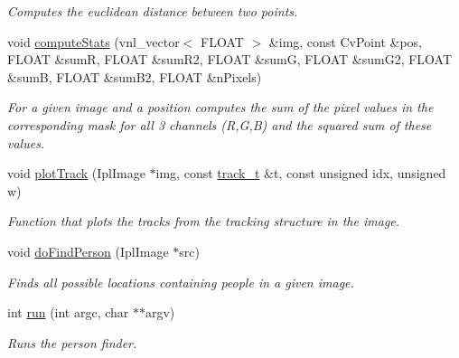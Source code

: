 \begin{DoxyCompactItemize}
\begin{DoxyCompactList}\small\item\em Computes the euclidean distance between two points. \item\end{DoxyCompactList}\item 
\hypertarget{classfindPersonImage_a2de4b333ccb9d7ef8251bb9e37cc1b67}{
void \hyperlink{classfindPersonImage_a2de4b333ccb9d7ef8251bb9e37cc1b67}{computeStats} (vnl\_\-vector$<$ FLOAT $>$ \&img, const CvPoint \&pos, FLOAT \&sumR, FLOAT \&sumR2, FLOAT \&sumG, FLOAT \&sumG2, FLOAT \&sumB, FLOAT \&sumB2, FLOAT \&nPixels)}
\label{classfindPersonImage_a2de4b333ccb9d7ef8251bb9e37cc1b67}

\begin{DoxyCompactList}\small\item\em For a given image and a position computes the sum of the pixel values in the corresponding mask for all 3 channels (R,G,B) and the squared sum of these values. \item\end{DoxyCompactList}\item 
\hypertarget{classfindPersonImage_abbe593e6141fbed267f5c2cac102edfe}{
void \hyperlink{classfindPersonImage_abbe593e6141fbed267f5c2cac102edfe}{plotTrack} (IplImage $\ast$img, const \hyperlink{structtrack__t}{track\_\-t} \&t, const unsigned idx, unsigned w)}
\label{classfindPersonImage_abbe593e6141fbed267f5c2cac102edfe}

\begin{DoxyCompactList}\small\item\em Function that plots the tracks from the tracking structure in the image. \item\end{DoxyCompactList}\item 
\hypertarget{classfindPersonImage_a9caac1c8c591b735d97d7346f3e33232}{
void \hyperlink{classfindPersonImage_a9caac1c8c591b735d97d7346f3e33232}{doFindPerson} (IplImage $\ast$src)}
\label{classfindPersonImage_a9caac1c8c591b735d97d7346f3e33232}

\begin{DoxyCompactList}\small\item\em Finds all possible locations containing people in a given image. \item\end{DoxyCompactList}\item 
int \hyperlink{classfindPersonImage_ac1f545534cdaab9094198a5dc2c2a79f}{run} (int argc, char $\ast$$\ast$argv)
\begin{DoxyCompactList}\small\item\em Runs the person finder. \item\end{DoxyCompactList}\end{DoxyCompactItemize}
